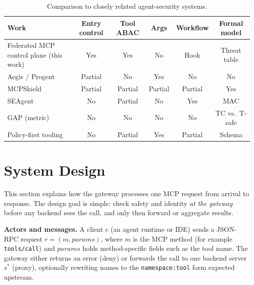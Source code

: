 \documentclass[11pt]{article}
\newcommand{\code}[1]{\texttt{#1}}
\newcommand{\aegis}{Aegis}
\newcommand{\mcpshield}{MCPShield}
\newcommand{\seagent}{SEAgent}
\begin{document}
\begin{table}[H]
\centering
\caption{Comparison to closely related agent-security systems.}
\label{tab:compare}
\footnotesize
\begin{tabular}{@{}lccccc@{}}
\toprule
Work & Entry control & Tool ABAC & Args & Workflow & Formal model \\
\midrule
Federated MCP control plane (this work) & Yes & Yes & No & Hook & Threat table \\
\aegis{} / Progent & Partial & No & Yes & No & No \\
\mcpshield & Partial & Partial & Partial & Partial & Yes \\
\seagent & No & Partial & No & Yes & MAC \\
GAP (metric) & No & No & No & No & TC vs.\ T-safe \\
Policy-first tooling & No & Partial & Yes & Partial & Schema \\
\bottomrule
\end{tabular}
\end{table}

\section{System Design}
\label{sec:design}

This section explains how the gateway processes one MCP request from arrival to response.
The design goal is simple: check safety and identity \emph{at the gateway} before any backend sees the call, and only then forward or aggregate results.

\textbf{Actors and messages.}
A client $c$ (an agent runtime or IDE) sends a JSON-RPC request $r=(m,\mathit{params})$, where $m$ is the MCP method (for example \code{tools/call}) and $\mathit{params}$ holds method-specific fields such as the tool name.
The gateway either returns an error (\textsf{deny}) or forwards the call to one backend server $s^*$ (\textsf{proxy}), optionally rewriting names to the \code{namespace:tool} form expected upstream.
\end{document}

